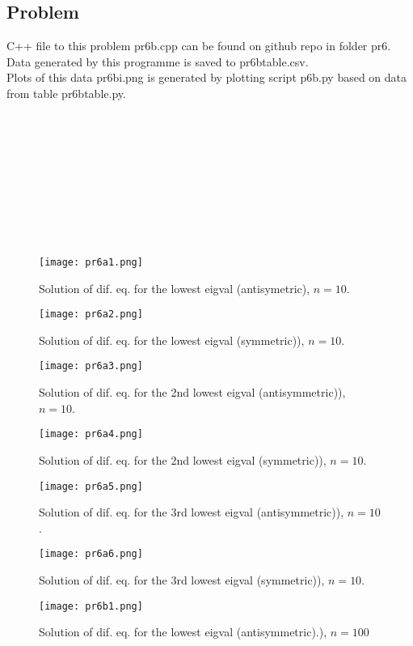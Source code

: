 \documentclass{article}
\begin{document}
\subsection{Problem}
C++ file to this problem pr6b.cpp can be found on github repo in folder pr6.\\
Data generated by this programme is saved to pr6btable.csv.\\
Plots of this data pr6bi.png is generated by plotting script p6b.py based on data from table pr6btable.py.\\
\\
\\
\\
\\
\\
\\
\\
\\
\\
\begin{figure}
  \caption{Solution of dif. eq. for the lowest eigval (antisymetric), $n=10$.}
  \centering
    \texttt{[image: pr6a1.png]}
\end{figure}
\begin{figure}
  \caption{Solution of dif. eq. for the lowest eigval (symmetric)), $n=10$.}
  \centering
    \texttt{[image: pr6a2.png]}
\end{figure}
\begin{figure}
  \caption{Solution of dif. eq. for the 2nd lowest eigval (antisymmetric)), $n=10$.}
  \centering
    \texttt{[image: pr6a3.png]}
\end{figure}
\begin{figure}
  \caption{Solution of dif. eq. for the 2nd lowest eigval (symmetric)), $n=10$.}
  \centering
    \texttt{[image: pr6a4.png]}
\end{figure}
\begin{figure}
  \caption{Solution of dif. eq. for the 3rd lowest eigval (antisymmetric)), $n=10$.}
  \centering
    \texttt{[image: pr6a5.png]}
\end{figure}
\begin{figure}
  \caption{Solution of dif. eq. for the 3rd lowest eigval (symmetric)), $n=10$.}
  \centering
    \texttt{[image: pr6a6.png]}
\end{figure}
\begin{figure}
  \caption{Solution of dif. eq. for the lowest eigval (antisymmetric).), $n=100$}
  \centering
    \texttt{[image: pr6b1.png]}
\end{figure}
\end{document}
